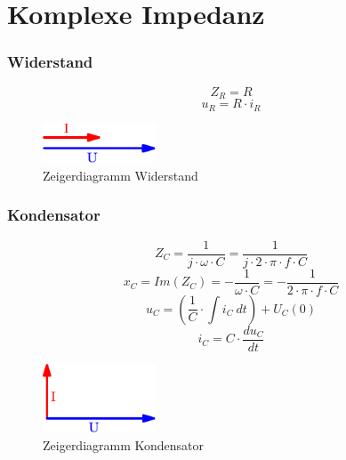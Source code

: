 



\section{Komplexe Impedanz}

\subsubsection{Widerstand}
\[ Z_R = R \]
\[ u_R = R \cdot i_R \]
\begin{figure}[h!]
	\centering
	\includegraphics[width=0.3\textwidth]{../fig/zeig_ui_wid.pdf}
	\caption{Zeigerdiagramm Widerstand}
	\label{fig:zeig_ui_wid}
\end{figure}

\newpage
\subsubsection{Kondensator}
\[ Z_C = \frac{1}{j \cdot \omega \cdot C} 
= \frac{1}{j \cdot 2 \cdot \pi \cdot f \cdot C} \]
\[ x_C = Im(Z_C) = -\frac{1}{\omega \cdot C} 
= -\frac{1}{2 \cdot \pi \cdot f \cdot C} \]
\[ u_C = \left( \frac{1}{C} \cdot \int i_C ~ dt \right) + U_C(0) \]
\[ i_C = C \cdot \frac{du_C}{dt} \]
\begin{figure}[h!]
	\centering
	\includegraphics[width=0.3\textwidth]{../fig/zeig_ui_kap.pdf}
	\caption{Zeigerdiagramm Kondensator}
	\label{fig:zeig_ui_kap}
\end{figure}

